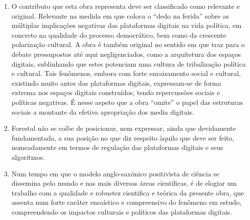 \documentclass[portuguese]{textolivre}
\begin{document}
\begin{enumerate}
    \item O contributo que esta obra representa deve ser classificado como relevante e original. Relevante na medida em que coloca o “dedo na ferida” sobre as múltiplas implicações negativas das plataformas digitais na vida política, em concreto na qualidade do processo democrático, bem como da crescente polarização cultural. A obra é também original no sentido em que traz para o debate pressupostos até aqui negligenciados, como a arquitetura dos espaços digitais, sublinhando que estes potenciam uma cultura de tribalização política e cultural. Tais fenômenos, embora com forte enraizamento social e cultural, existindo muito antes das plataformas digitais, expressam-se de forma extrema nos espaços digitais construídos, tendo repercussões sociais e políticas negativas. É nesse aspeto que a obra “omite” o papel das estruturas sociais a montante da efetiva apropriação dos media digitais.
    \item Forestal não se coíbe de posicionar, nem expressar, ainda que devidamente fundamentada, a sua posição no que diz respeito àquilo que deve ser feito, nomeadamente em termos de regulação das plataformas digitais e seus algoritmos.
    \item Num tempo em que o modelo anglo-saxónico positivista de ciência se dissemina pelo mundo e nas mais diversas áreas científicas, é de elogiar um trabalho com a qualidade e robustez cientifica e teórica da presente obra, que assenta num forte caráter ensaístico e compreensivo do fenômeno em estudo, compreendendo os impactos culturais e políticos das plataformas digitais. 
\end{enumerate}


\printbibliography\label{sec-bib}
\end{document}
